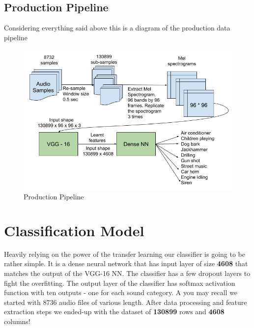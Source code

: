 \hypertarget{production-pipeline}{%
\subsection{Production Pipeline}\label{production-pipeline}}

Considering everything said above this is a diagram of the production
data pipeline

\begin{Schunk}
\begin{figure}[H]

{\centering \includegraphics[width=1\linewidth]{../images/pipeline} 

}

\caption[Production Pipeline]{Production Pipeline}\label{fig:pipeline}
\end{figure}
\end{Schunk}

\hypertarget{classification-model}{%
\section{Classification Model}\label{classification-model}}

Heavily relying on the power of the transfer learning our classifier is
going to be rather simple. It is a dense neural network that has input
layer of size \textbf{4608} that matches the output of the VGG-16 NN.
The classifier has a few dropout layers to fight the overfitting. The
output layer of the classifier has softmax activation function with ten
outputs - one for each sound category. A you may recall we started with
8736 audio files of various length. After data processing and feature
extraction steps we ended-up with the dataset of \textbf{130899} rows
and \textbf{4608} columns!


